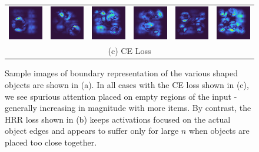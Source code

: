 \documentclass[letterpaper]{article} %
\begin{document}
\begin{figure}[!t]
\begin{tabular}{cccccc}
\multicolumn{1}{c}{\includegraphics[width=0.125\columnwidth]{saliency/ce/edges/edges_1.png}} \hspace{-12pt} &  \multicolumn{1}{c}{\includegraphics[width=0.125\columnwidth]{saliency/ce/edges/edges_2.png}} \hspace{-12pt} & \multicolumn{1}{c}{\includegraphics[width=0.125\columnwidth]{saliency/ce/edges/edges_3.png}} \hspace{-12pt} & \multicolumn{1}{c}{\includegraphics[width=0.125\columnwidth]{saliency/ce/edges/edges_4.png}} \hspace{-12pt} & \multicolumn{1}{c}{\includegraphics[width=0.125\columnwidth]{saliency/ce/edges/edges_5.png}} \hspace{-12pt} & \multicolumn{1}{c}{\includegraphics[width=0.125\columnwidth]{saliency/ce/edges/edges_6.png}} \\
\multicolumn{6}{c}{(c) CE Loss}
\end{tabular}
\caption{Sample images of boundary representation of the various shaped objects are shown in (a). In all cases with the CE loss shown in (c), we see spurious attention placed on empty regions of the input - generally increasing in magnitude with more items. By contrast, the HRR loss shown in (b) keeps activations focused on the actual object edges and appears to suffer only for large $n$ when objects are placed too close together.}
\label{fig:boundary_saliency}
\end{figure}
\end{document}
